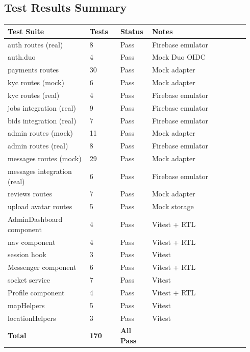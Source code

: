 \documentclass[11pt]{article}
\begin{document}
\subsection{Test Results Summary}

\begin{longtable}{@{}p{0.32\linewidth} p{0.12\linewidth} p{0.12\linewidth} p{0.38\linewidth}@{}}
\toprule
\textbf{Test Suite} & \textbf{Tests} & \textbf{Status} & \textbf{Notes} \\
\midrule
\endhead
auth routes (real)          & 8  & Pass & Firebase emulator \\
auth.duo                    & 4  & Pass & Mock Duo OIDC \\
payments routes             & 30 & Pass & Mock adapter \\
kyc routes (mock)           & 6  & Pass & Mock adapter \\
kyc routes (real)           & 4  & Pass & Firebase emulator \\
jobs integration (real)     & 9  & Pass & Firebase emulator \\
bids integration (real)     & 7  & Pass & Firebase emulator \\
admin routes (mock)         & 11 & Pass & Mock adapter \\
admin routes (real)         & 8  & Pass & Firebase emulator \\
messages routes (mock)      & 29 & Pass & Mock adapter \\
messages integration (real) & 6  & Pass & Firebase emulator \\
reviews routes              & 7  & Pass & Mock adapter \\
upload avatar routes        & 5  & Pass & Mock storage \\
AdminDashboard component    & 4  & Pass & Vitest + RTL \\
nav component               & 4  & Pass & Vitest + RTL \\
session hook                & 3  & Pass & Vitest \\
Messenger component         & 6  & Pass & Vitest + RTL \\
socket service              & 7  & Pass & Vitest \\
Profile component           & 4  & Pass & Vitest + RTL \\
mapHelpers                  & 5  & Pass & Vitest \\
locationHelpers             & 3  & Pass & Vitest \\
\midrule
\textbf{Total}              & \textbf{170} & \textbf{All Pass} & \\
\bottomrule
\end{longtable}
\end{document}

